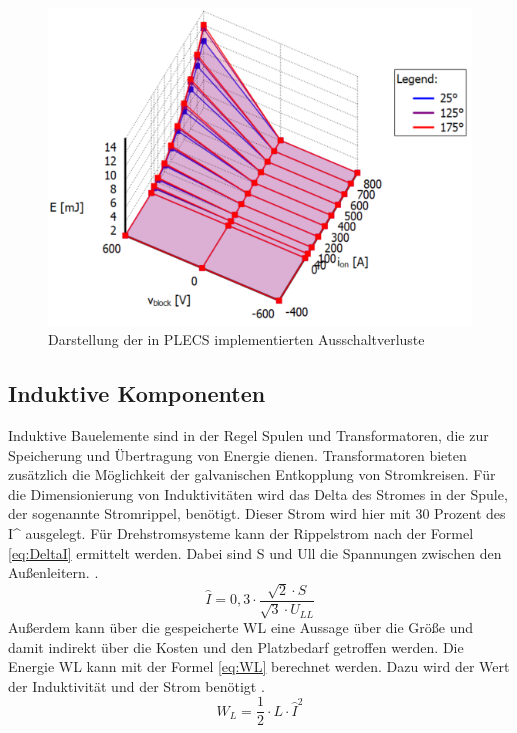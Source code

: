 		\begin{figure}
			\centering
			\includegraphics[width=0.7\linewidth]{content/Grafiken/PLECS_FF2ThermalModel}
			\caption{Darstellung der in PLECS implementierten Ausschaltverluste \cite{IFAGFF2}}
			\label{fig:plecsff2thermalmodel}
		\end{figure}
		
		\subsection{Induktive Komponenten}
		Induktive Bauelemente sind in der Regel Spulen und Transformatoren, die zur Speicherung und Übertragung von Energie dienen. Transformatoren bieten zusätzlich die Möglichkeit der galvanischen Entkopplung von Stromkreisen. 
		Für die Dimensionierung von Induktivitäten wird das Delta des Stromes in der Spule, der sogenannte Stromrippel, benötigt. Dieser Strom wird hier mit 30 Prozent des \gls{I^} ausgelegt. Für Drehstromsysteme kann der Rippelstrom nach der Formel \ref{eq:DeltaI} ermittelt werden. Dabei sind \gls{S} und \gls{Ull} die Spannungen zwischen den Außenleitern. \cite{Boge.2007}.\\
		\begin{equation}
			\label{eq:DeltaI}
			\hat{I} = 0,3 \cdot \dfrac{\sqrt{2} \cdot S}{\sqrt{3} \cdot U_{LL}}
		\end{equation}
		Außerdem kann über die gespeicherte \gls{WL} eine Aussage über die Größe und damit indirekt über die Kosten und den Platzbedarf getroffen werden. Die Energie \gls{WL} kann mit der Formel \ref{eq:WL} berechnet werden. Dazu wird der Wert der Induktivität und der Strom benötigt \cite{Boge.2007}.
		\begin{equation}
			\label{eq:WL}
			W_{L} =\dfrac{1}{2}\cdot L\cdot \hat{I}^{2}
		\end{equation}
		
